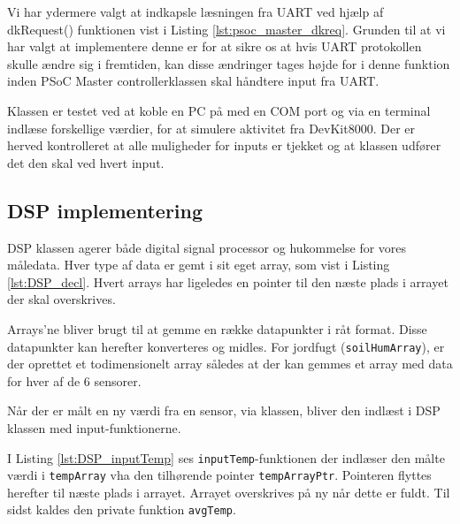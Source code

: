 Vi har ydermere valgt at indkapsle læsningen fra UART ved hjælp af dkRequest() funktionen vist i Listing \ref{lst:psoc_master_dkreq}. 
Grunden til at vi har valgt at implementere denne er for at sikre os at hvis UART protokollen skulle ændre sig i fremtiden, kan disse ændringer tages højde for i denne funktion inden PSoC Master controllerklassen skal håndtere input fra UART.

Klassen er testet ved at koble en PC på med en COM port og via en terminal indlæse forskellige værdier, for at simulere aktivitet fra DevKit8000. Der er herved kontrolleret at alle muligheder for inputs er tjekket og at klassen udfører det den skal ved hvert input.

\subsection{DSP implementering}\label{sec:DSP_impl}
DSP klassen agerer både digital signal processor og hukommelse for vores måledata. 
Hver type af data er gemt i sit eget array, som vist i Listing \ref{lst:DSP_decl}. 
Hvert arrays har ligeledes en pointer til den næste plads i arrayet der skal overskrives.



Arrays'ne bliver brugt til at gemme en række datapunkter i råt format. Disse datapunkter kan herefter konverteres og midles.
For jordfugt (\texttt{soilHumArray}), er der oprettet et todimensionelt array således at der kan gemmes et array med data for hver af de 6 sensorer.

Når der er målt en ny værdi fra en sensor, via \IIC klassen, bliver den indlæst i DSP klassen med input-funktionerne.



I Listing \ref{lst:DSP_inputTemp} ses \texttt{inputTemp}-funktionen der indlæser den målte værdi i \texttt{tempArray} vha den tilhørende pointer \texttt{tempArrayPtr}. Pointeren flyttes herefter til næste plads i arrayet. Arrayet overskrives på ny når dette er fuldt. Til sidst kaldes den private funktion \texttt{avgTemp}.

